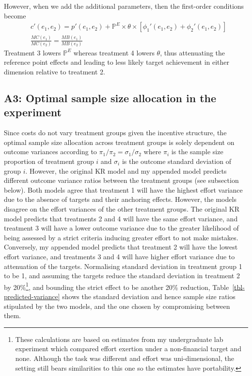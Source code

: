 \documentclass[
  12,
  letterpaper,
  DIV=11,
  numbers=noendperiod]{scrartcl}
\begin{document}
However, when we add the additional parameters, then the first-order
conditions become \[
\begin{aligned}
& c'(e_1, e_2) = p'(e_1, e_2) + \mathbb{P}^E \times \theta \times [\phi_1'(e_1, e_2) + \phi_2'(e_1, e_2)] \nonumber \\ 
& \frac {MC(e_1)}{MC(e_2)} = \frac {MB(e_1)}{MB(e_2)} \nonumber
\end{aligned}
\] Treatment 3 lowers \(\mathbb{P}^E\) whereas treatment 4 lowers
\(\theta\), thus attenuating the reference point effects and leading to
less likely target achievement in either dimension relative to treatment
2.

\subsection{A3: Optimal sample size allocation in the
experiment}\label{a3-optimal-sample-size-allocation-in-the-experiment}

Since costs do not vary treatment groups given the incentive structure,
the optimal sample size allocation across treatment groups is solely
dependent on outcome variances according to
\(\pi_1/\pi_2 = \sigma_1/\sigma_2\) where \(\pi_i\) is the sample size
proportion of treatment group \(i\) and \(\sigma_i\) is the outcome
standard deviation of group \(i\). However, the original KR model and my
appended model predicts different outcome variance ratios between the
treatment groups (see subsection below). Both models agree that
treatment 1 will have the highest effort variance due to the absence of
targets and their anchoring effects. However, the models disagree on the
effort variances of the other treatment groups. The original KR model
predicts that treatments 2 and 4 will have the same effort variance, and
treatment 3 will have a lower outcome variance due to the greater
likelihood of being assessed by a strict criteria inducing greater
effort to not make mistakes. Conversely, my appended model predicts that
treatment 2 will have the lowest effort variance, and treatments 3 and 4
will have higher effort variance due to attenuation of the targets.
Normalising standard deviation in treatment group 1 to be 1, and
assuming the targets reduce the standard deviation in treatment 2 by
20\%\footnote{These calculations are based on estimates from my
  undergraduate lab experiment which compared effort exertion under a
  non-financial target and none. Although the task was different and
  effort was uni-dimensional, the setting still bears similarities to
  this one so the estimates have portability.}, and bounding the strict
effect to be another 20\% reduction, Table~\ref{tbl-predicted-variance}
shows the standard deviation and hence sample size ratios stipulated by
the two models, and the one chosen by compromising between them.
\end{document}
